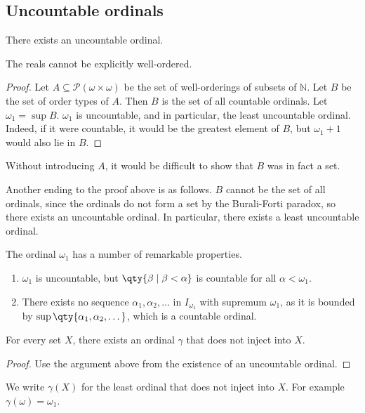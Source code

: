\subsection{Uncountable ordinals}
\begin{theorem}
    There exists an uncountable ordinal.
\end{theorem}
\begin{remark}
    The reals cannot be explicitly well-ordered.
\end{remark}
\begin{proof}
    Let $A \subseteq \mathcal P (\omega \times \omega)$ be the set of well-orderings of subsets of $\mathbb N$.
    Let $B$ be the set of order types of $A$.
    Then $B$ is the set of all countable ordinals.
    Let $\omega_1 = \sup B$.
    $\omega_1$ is uncountable, and in particular, the least uncountable ordinal.
    Indeed, if it were countable, it would be the greatest element of $B$, but $\omega_1 + 1$ would also lie in $B$.
\end{proof}
\begin{remark}
    Without introducing $A$, it would be difficult to show that $B$ was in fact a set.
\end{remark}
\begin{remark}
    Another ending to the proof above is as follows.
    $B$ cannot be the set of all ordinals, since the ordinals do not form a set by the Burali-Forti paradox, so there exists an uncountable ordinal.
    In particular, there exists a least uncountable ordinal.
\end{remark}
The ordinal $\omega_1$ has a number of remarkable properties.
\begin{enumerate}
    \item $\omega_1$ is uncountable, but $\qty{\beta \mid \beta < \alpha}$ is countable for all $\alpha < \omega_1$.
    \item There exists no sequence $\alpha_1, \alpha_2, \dots$ in $I_{\omega_1}$ with supremum $\omega_1$, as it is bounded by $\sup\qty{\alpha_1, \alpha_2, \dots}$, which is a countable ordinal.
\end{enumerate}
\begin{theorem}
    For every set $X$, there exists an ordinal $\gamma$ that does not inject into $X$.
\end{theorem}
\begin{proof}
    Use the argument above from the existence of an uncountable ordinal.
\end{proof}
We write $\gamma(X)$ for the least ordinal that does not inject into $X$.
For example $\gamma(\omega) = \omega_1$.

